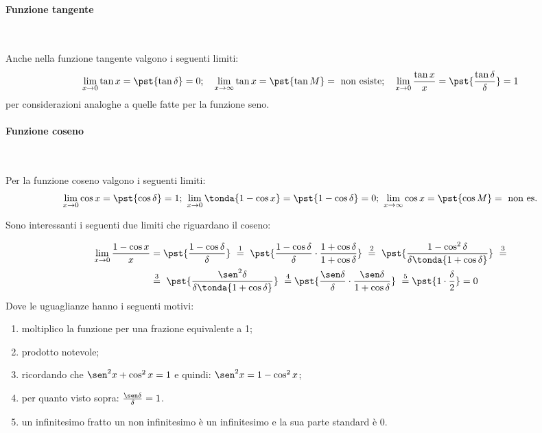 \paragraph{Funzione tangente}~

Anche nella funzione tangente valgono i seguenti limiti:
\[\lim_{x \rightarrow 0}{\tan x} = \pst{\tan \delta} = 0; \quad
\lim_{x \rightarrow \infty}{\tan x} = \pst{\tan M} = 
                                      \text{ non esiste}; \quad
\lim_{x \rightarrow 0}\frac{\tan x}{x} = \pst{\frac{\tan \delta}{\delta}} 
                                       = 1\]
per considerazioni analoghe a quelle fatte per la funzione seno.

\paragraph{Funzione coseno}~

Per la funzione coseno valgono i seguenti limiti:
\[\lim_{x \rightarrow 0}{\cos x} = \pst{\cos \delta} = 1; ~
\lim_{x \rightarrow 0}\tonda{1-\cos x} = \pst{1-\cos \delta} = 0; ~
\lim_{x \rightarrow \infty}{\cos x} = \pst{\cos M} = \text{ non es.}\]

Sono interessanti i seguenti due limiti che riguardano il coseno:

\begin{align*}
 \lim_{x \rightarrow 0} \frac{1-\cos x}{x} &=
 \pst{\frac{1-\cos \delta}{\delta}}
~ \stackrel{1}{=} ~  
 \pst{\frac{1-\cos \delta}{\delta} \cdot 
      \frac{1+\cos \delta}{1+\cos \delta}}
~ \stackrel{2}{=} ~ 
 \pst{\frac{1-\cos^2 \delta}{\delta \tonda{1+\cos \delta}}}~ 
\stackrel{3}{=} \\
& \stackrel{3}{=} ~
 \pst{\frac{\sen^2 \delta}{\delta \tonda{1+\cos \delta}}}
~ \stackrel{4}{=}
 \pst{\frac{\sen \delta}{\delta} \cdot 
      \frac{\sen \delta}{1+\cos \delta}}
~ \stackrel{5}{=}
 \pst{1 \cdot \frac{\delta}{2}} = 0
\end{align*}
Dove le uguaglianze hanno i seguenti motivi:
\begin{enumerate} [nosep]
 \item moltiplico la funzione per una frazione equivalente a 1;
 \item prodotto notevole;
 \item ricordando che \(\sen^2 x + \cos^2 x = 1\) e quindi: 
 \(\sen^2 x = 1 - \cos^2 x\);
 \item per quanto visto sopra: \(\frac{\sen \delta}{\delta} = 1\).
 \item un infinitesimo fratto un non infinitesimo è un infinitesimo 
e la sua parte standard è 0.
\end{enumerate}

